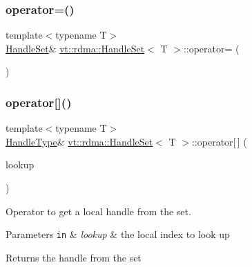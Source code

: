 \subsubsection{\texorpdfstring{operator=()}{operator=()}\hspace{0.1cm}{\footnotesize\ttfamily [2/2]}}
{\footnotesize\ttfamily template$<$typename T$>$ \\
\hyperlink{structvt_1_1rdma_1_1_handle_set}{Handle\+Set}\& \hyperlink{structvt_1_1rdma_1_1_handle_set}{vt\+::rdma\+::\+Handle\+Set}$<$ T $>$\+::operator= (\begin{DoxyParamCaption}\item[{\hyperlink{structvt_1_1rdma_1_1_handle_set}{Handle\+Set}$<$ T $>$ \&\&}]{ }\end{DoxyParamCaption})\hspace{0.3cm}{\ttfamily [default]}}

\mbox{\label{structvt_1_1rdma_1_1_handle_set_ab435257f5fa0f6af282e2775eb41c8c7}} 
\subsubsection{\texorpdfstring{operator[]()}{operator[]()}}
{\footnotesize\ttfamily template$<$typename T$>$ \\
\hyperlink{structvt_1_1rdma_1_1_handle_set_ab3a698ee86bae503dfa84617205b2dd9}{Handle\+Type}\& \hyperlink{structvt_1_1rdma_1_1_handle_set}{vt\+::rdma\+::\+Handle\+Set}$<$ T $>$\+::operator\mbox{[}$\,$\mbox{]} (\begin{DoxyParamCaption}\item[{\hyperlink{structvt_1_1rdma_1_1_handle_set_a81d333ec397f0becb9fe692e53145441}{Lookup\+Type}}]{lookup }\end{DoxyParamCaption})\hspace{0.3cm}{\ttfamily [inline]}}



Operator to get a local handle from the set. 


\begin{DoxyParams}[1]{Parameters}
\mbox{\tt in}  & {\em lookup} & the local index to look up\\
\hline
\end{DoxyParams}
\begin{DoxyReturn}{Returns}
the handle from the set 
\end{DoxyReturn}
\mbox{\label{structvt_1_1rdma_1_1_handle_set_a4a78a0c0e54d6044676c560c00fba248}} 
